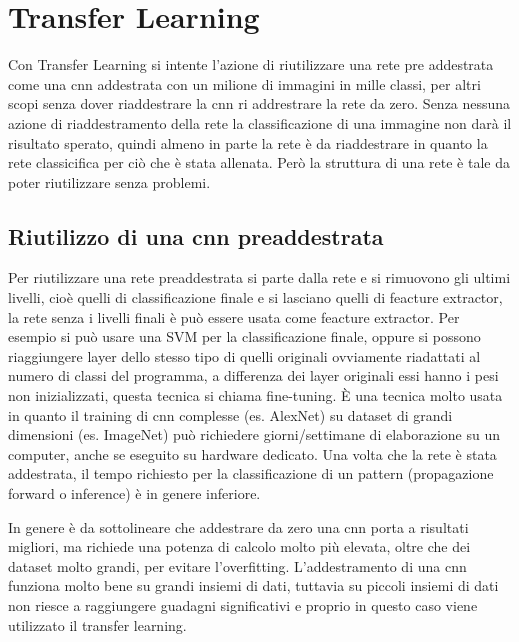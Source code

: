 \chapter{Transfer Learning}\label{transfer-learning}

Con Transfer Learning si intente l'azione di riutilizzare una rete pre addestrata come una \gls{cnn} addestrata con un milione di immagini in mille classi, per altri scopi senza dover riaddestrare la \gls{cnn} ri addrestrare la rete da zero. Senza nessuna azione di riaddestramento della rete la classificazione di una immagine non darà il risultato sperato, quindi almeno in parte la rete è da riaddestrare in quanto la rete classicifica per ciò che è stata allenata. Però la struttura di una rete è tale da poter riutilizzare senza problemi. 

\section{Riutilizzo di una \gls{cnn} preaddestrata}\label{riutilizzo-di-una-cnn-preaddestrata}

Per riutilizzare una rete preaddestrata si parte dalla rete e si rimuovono gli ultimi livelli, cioè quelli di classificazione finale e si lasciano quelli di feacture extractor, la rete senza i livelli finali è può essere usata come feacture extractor. Per esempio si può usare una SVM per la classificazione finale, oppure si possono riaggiungere layer dello stesso tipo di quelli originali ovviamente riadattati al numero di classi del programma, a differenza dei layer originali essi hanno i pesi non inizializzati, questa tecnica si chiama fine-tuning. È una tecnica molto usata in quanto il training di \gls{cnn} complesse (es. AlexNet) su dataset di grandi dimensioni (es. ImageNet) può richiedere giorni/settimane di elaborazione su un computer, anche se eseguito su hardware dedicato. Una volta che la rete è stata addestrata, il tempo richiesto per la classificazione di un  pattern (\gls{propagazione forward} o inference) è in genere inferiore\cite{yosinski_tl}\cite{unibo_maltoni_ml}.

In genere è da sottolineare che addestrare da zero una \gls{cnn} porta a risultati migliori, ma richiede una potenza di calcolo molto più  elevata, oltre che dei dataset molto grandi, per evitare l'\gls{overfitting}. L'addestramento di una \gls{cnn} funziona molto bene su grandi insiemi di dati, tuttavia su piccoli insiemi di dati non riesce a raggiungere guadagni significativi e proprio in questo caso viene utilizzato il transfer learning\cite{joel_tl}.


